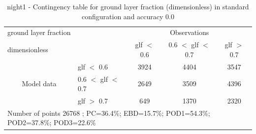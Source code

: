 \begin{table}[p!]
\begin{center}
\begin{tabular}{llccc}
\hline
{ground layer fraction}                                       &                                                    & \multicolumn{3}{c}{Observations}                 \\
{dimensionless}                                       &                             & glf $<$ 0.6   & 0.6 $<$ glf $<$ 0.7 & glf $>$ 0.7 \\
\hline
\multicolumn{1}{c}{\multirow{3}{*}{Model data}}  & glf $<$ 0.6             & 3924                & 4404                       & 3547              \\
                                                 & 0.6  $<$ glf $<$ 0.7 & 2649                & 3509                       & 4396              \\
                                                 & glf $>$ 0.7             & 649                & 1370                       & 2320              \\
\hline
\multicolumn{5}{l}{ Number of points        26768 ; PC=36.4\%; EBD=15.7\%; POD1=54.3\%; POD2=37.8\%; POD3=22.6\%}
\end{tabular}
\end{center}
\caption{night1 - Contingency table for  ground layer fraction (dimensionless) in standard configuration and accuracy 0.0}
\label{tab:contingencyglfBEF:night1}
\end{table}

